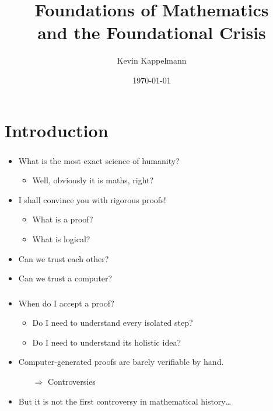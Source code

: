 \documentclass{beamer}
\title[Mathematical Foundations and the Foundational Crisis]{Foundations of Mathematics\\and the Foundational Crisis} %
\author{Kevin Kappelmann} %
\institute[TUM] %
{Technical University of Munich}
\date{\today} %
\begin{document}
\begin{frame}
\titlepage %
\end{frame}

\section*{Introduction}

\begin{frame}
    \frametitle{}
    \begin{itemize}[<+->]
	\item What is the most exact science of humanity?
	\begin{itemize}
		\item Well, obviously it is maths, right?
	\end{itemize}
	\item I shall convince you with rigorous proofs!
	\begin{itemize}
		\item What is a proof?
		\item What is logical?
	\end{itemize}
	\item Can we trust each other?
	\item Can we trust a computer?
    \end{itemize}
\end{frame}

\begin{frame}
    \frametitle{}
    \begin{itemize}[<+->]
	\item When do I accept a proof?
	\begin{itemize}
		\item Do I need to understand every isolated step?
		\item Do I need to understand its holistic idea?
	\end{itemize}
	\item Computer-generated proofs are barely verifiable by hand.
	\begin{itemize}
		\item[$\Rightarrow$] Controversies
	\end{itemize}
	\item But it is not the first controversy in mathematical history\ldots
    \end{itemize}
\end{frame}
\end{document}
